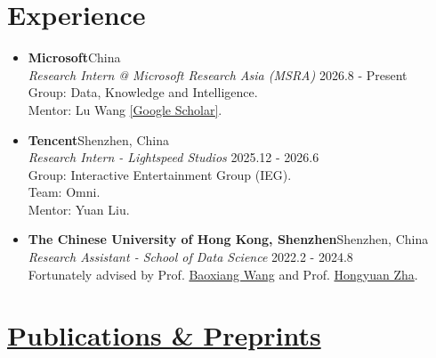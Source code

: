 \documentclass[a4paper,20pt]{article}
\newcommand{\resumeSubheading}[5]{
  \item \textbf{#1}{\hfill #2} \\
        #3 \hfill #4 \\
        #5
}
\newcommand{\resumeSubHeadingListStart}{\begin{itemize}[leftmargin=*]}
\newcommand{\resumeSubHeadingListEnd}{\end{itemize}}
\begin{document}
\vspace{5pt}
\section{Experience}
\vspace{3pt}

\resumeSubHeadingListStart
    \resumeSubheading{Microsoft}{China}
    {\textit{Research Intern @ Microsoft Research Asia (MSRA)}}{2026.8 - Present}
    {Group: Data, Knowledge and Intelligence.\\
    Mentor: Lu Wang \href{https://scholar.google.com/citations?user=hqlU92YAAAAJ}{[Google Scholar]}.}
    \resumeSubheading{Tencent}{Shenzhen, China}
    {\textit{Research Intern - Lightspeed Studios}}{2025.12 - 2026.6}
    {Group: Interactive Entertainment Group (IEG).\\
    Team: Omni.\\
    Mentor: Yuan Liu.}
    \resumeSubheading{The Chinese University of Hong Kong, Shenzhen}{Shenzhen, China}
    {\textit{Research Assistant - School of Data Science}}{2022.2 - 2024.8}
    {Fortunately advised by Prof. \href{https://bxiangwang.github.io/}{Baoxiang Wang} and Prof. \href{https://scholar.google.com/citations?user=n1DQMIsAAAAJ&hl=en&oi=ao}{Hongyuan Zha}.}
\resumeSubHeadingListEnd

\vspace{5pt}
\section{\href{https://scholar.google.com/citations?user=fbvQHX4AAAAJ&hl=zh-CN&oi=sra}{Publications \& Preprints}}
\vspace{3pt}
\end{document}
